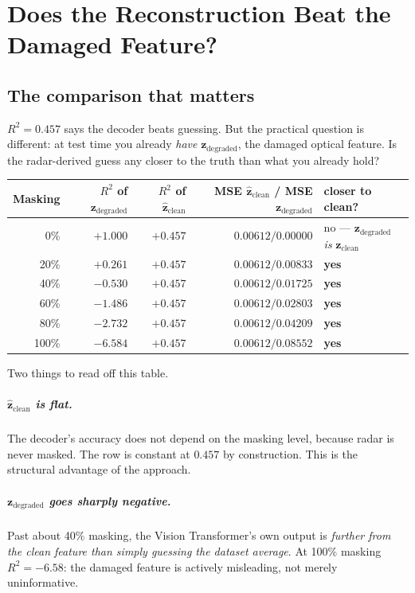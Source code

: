 \documentclass[11pt,a4paper]{report}
\newcommand{\zc}{\mathbf{z}_{\text{clean}}}
\newcommand{\zd}{\mathbf{z}_{\text{degraded}}}
\newcommand{\zh}{\hat{\mathbf{z}}_{\text{clean}}}
\begin{document}
\chapter{Does the Reconstruction Beat the Damaged Feature?}
\label{ch:recon}

\section{The comparison that matters}

$R^2 = 0.457$ says the decoder beats guessing. But the practical question is
different: at test time you already \emph{have} $\zd$, the damaged optical
feature. Is the radar-derived guess any closer to the truth than what you
already hold?

\begin{center}
\small
\begin{tabular}{@{}rrrrl@{}}
\toprule
\textbf{Masking} & $R^2$ \textbf{of} $\zd$ & $R^2$ \textbf{of} $\zh$ &
\textbf{MSE} $\zh$ / \textbf{MSE} $\zd$ & \textbf{closer to clean?} \\
\midrule
0\%   & $+1.000$ & $+0.457$ & $0.00612 / 0.00000$ & no --- $\zd$ \emph{is} $\zc$ \\
20\%  & $+0.261$ & $+0.457$ & $0.00612 / 0.00833$ & \textbf{yes} \\
40\%  & $-0.530$ & $+0.457$ & $0.00612 / 0.01725$ & \textbf{yes} \\
60\%  & $-1.486$ & $+0.457$ & $0.00612 / 0.02803$ & \textbf{yes} \\
80\%  & $-2.732$ & $+0.457$ & $0.00612 / 0.04209$ & \textbf{yes} \\
100\% & $-6.584$ & $+0.457$ & $0.00612 / 0.08552$ & \textbf{yes} \\
\bottomrule
\end{tabular}
\end{center}

Two things to read off this table.

\paragraph{$\zh$ is flat.} The decoder's accuracy does not depend on the masking
level, because radar is never masked. The row is constant at $0.457$ by
construction. This is the structural advantage of the approach.

\paragraph{$\zd$ goes sharply negative.} Past about 40\% masking, the Vision
Transformer's own output is \emph{further from the clean feature than simply
guessing the dataset average}. At 100\% masking $R^2 = -6.58$: the damaged
feature is actively misleading, not merely uninformative.
\end{document}
